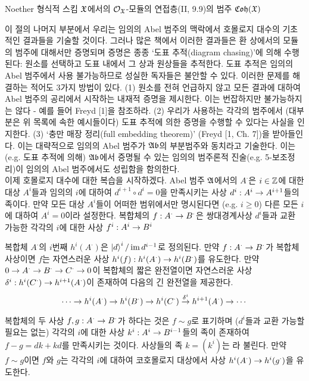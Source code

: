 	
	\begin{example}
	Noether 형식적 스킴 $\mathfrak{X}$에서의 $\mathcal{O}_{\mathfrak{X}}$-모듈의 연접층(II, 9.9)의 범주 $\mathfrak{Coh}(\mathfrak{X})$
	\end{example}
	
	이 절의 나머지 부분에서 우리는 임의의 Abel 범주의 맥락에서 호몰로지 대수의 기초적인 결과들을 기술할 것이다.
	그러나 많은 책에서 이러한 결과들은 환 상에서의 모듈의 범주에 대해서만 증명되며 증명은 종종 `도표 추적(diagram chasing)'에 의해 수행된다:
	원소를 선택하고 도표 내에서 그 상과 원상들을 추적한다.
	도표 추적은 임의의 Abel 범주에서 사용 불가능하므로 성실한 독자들은 불안할 수 있다.
	이러한 문제를 해결하는 적어도 3가지 방법이 있다.
	(1) 원소를 전혀 언급하지 않고 모든 결과에 대하여 Abel 범주의 공리에서 시작하는 내재적 증명을 제시한다.
	이는 번잡하지만 불가능하지는 않다 - 예를 들어 Freyd [1]을 참조하라.
	(2) 우리가 사용하는 각각의 범주에서 (대부분은 위 목록에 속한 예시들이다) 도표 추적에 의한 증명을 수행할 수 있다는 사실을 인지한다.
	(3) `충만 매장 정리(full embedding theorem)' (Freyd [1, Ch. 7])을 받아들인다.
	이는 대략적으로 임의의 Abel 범주가 $\mathfrak{Ab}$의 부분범주와 동치라고 기술한다.
	이는 (e.g. 도표 추적에 의해) $\mathfrak{Ab}$에서 증명될 수 있는 임의의 범주론적 진술(e.g. 5-보조정리)이 임의의 Abel 범주에서도 성립함을 함의한다.\\
	
	이제 호몰로지 대수에 대한 복습을 시작하겠다. Abel 범주 $\mathfrak{A}$에서의  $A^\cdot$은
	$i\in\mathbb Z$에 대한 대상 $A^i$들과 임의의 $i$에 대하여 $d^{i+1}\circ d^i=0$을 만족시키는 사상 $d^i:A^i\rightarrow A^{i+1}$들의 족이다.
	만약 모든 대상 $A^i$들이 어떠한 범위에서만 명시된다면 (e.g. $i\ge 0$) 다른 모든 $i$에 대하여 $A^i=0$이라 설정한다.
	복합체의  $f:A^\cdot\rightarrow B^\cdot$은 쌍대경계사상 $d^i$들과 교환 가능한 각각의 $i$에 대한 사상 $f^i:A^i\rightarrow B^i$
	
	복합체 $A^\cdot$의 $i$번째  $h^i(A^\cdot)$은 $\ket d^i/\operatorname{im} d^{i-1}$로 정의된다.
	만약 $f:A^\cdot\rightarrow B^\cdot$가 복합체 사상이면 $f$는 자연스러운 사상 $h^i(f):h^i(A^\cdot)\rightarrow h^i(B^\cdot)$를 유도한다.
	만약 $0\rightarrow A^\cdot\rightarrow B^\cdot\rightarrow C^\cdot\rightarrow 0$이 복합체의 짧은 완전열이면
	자연스러운 사상 $\delta^i:h^i(C^\cdot)\rightarrow h^{i+1}(A^\cdot)$이 존재하여 다음의 긴 완전열을 제공한다.
	$$\cdots\rightarrow h^i(A^\cdot)\rightarrow h^i(B^\cdot)\rightarrow h^i(C^\cdot)\stackrel{\delta^i}{\rightarrow} h^{i+1}(A^\cdot)\rightarrow\cdots$$
	
	복합체의 두 사상 $f,g:A^\cdot\rightarrow B^\cdot$가 하다는 것은 $f\sim g$로 표기하며
	($d^i$들과 교환 가능할 필요는 없는) 각각의 $i$에 대한 사상 $k^i:A^i\rightarrow B^{i-1}$들의 족이 존재하여 $f-g=dk+kd$를 만족시키는 것이다.
	사상들의 족 $k=(k^i)$는 라 불린다.
	만약 $f\sim g$이면 $f$와 $g$는 각각의 $i$에 대하여 코호몰로지 대상에서  사상 $h^i(A^\cdot)\rightarrow h^i(g^\cdot)$을 유도한다.
	
